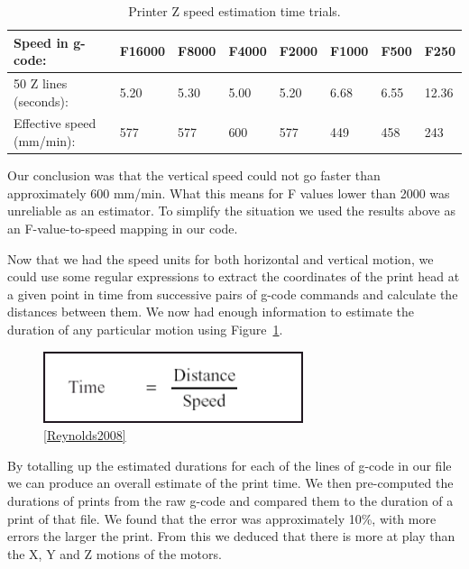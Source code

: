 \documentclass[11pt]{report} %
\begin{document}
\begin{table}[h]{\begin{minipage}{\textwidth}
\begin{tabular}{| l || l | l | l | l | l | l | l |}
\hline
Speed in g-code: & F16000 & F8000 & F4000 & F2000 & F1000 & F500 & F250 \\\hline
50 Z lines (seconds): & 5.20 & 5.30 & 5.00 & 5.20 & 6.68 & 6.55 & 12.36 \\\hline
Effective speed (mm/min): & 577 & 577 & 600 & 577 & 449 & 458 & 243 \\\hline

\end{tabular}
\caption{Printer Z speed estimation time trials.}
\label{table:speedTimes}
\end{minipage} }
\end{table}

Our conclusion was that the vertical speed could not go faster than approximately 600 mm/min. What this means for F values lower than 2000 was unreliable as an estimator. To simplify the situation we used the results above as an F-value-to-speed mapping in our code.

Now that we had the speed units for both horizontal and vertical motion, we could use some regular expressions to extract the coordinates of the print head at a given point in time from successive pairs of g-code commands and calculate the distances between them. We now had enough information to estimate the duration of any particular motion using Figure~\ref{figure:TDS}.

\begin{figure}[H]
  \centering
  \includegraphics[width=3in]{TDS.png}
  \caption{\ref{Reynolds2008}}
  \label{figure:TDS}
\end{figure}

By totalling up the estimated durations for each of the lines of g-code in our file we can produce an overall estimate of the print time. We then pre-computed the durations of prints from the raw g-code and compared them to the duration of a print of that file. We found that the error was approximately 10\%, with more errors the larger the print. From this we deduced that there is more at play than the X, Y and Z motions of the motors.
\end{document}
